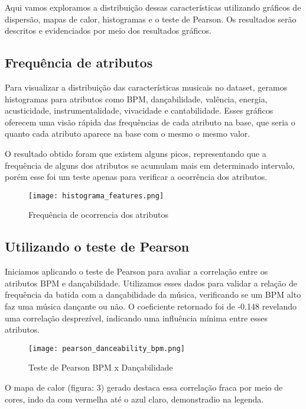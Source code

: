 \documentclass[12pt]{article}
\begin{document}
Aqui vamos exploramos a distribuição dessas características utilizando gráficos de dispersão, mapas de calor, histogramas e o teste de Pearson\cite{kaggle-spotify-analysis}. Os resultados serão descritos e evidenciados por meio dos resultados gráficos.

\subsection{Frequência de atributos}

Para visualizar a distribuição das características musicais no dataset, geramos histogramas para atributos como BPM, dançabilidade, valência, energia, acusticidade, instrumentalidade, vivacidade e cantabilidade. Esses gráficos oferecem uma visão rápida das frequências de cada atributo na base, que seria o quanto cada atributo aparece na base com o mesmo o mesmo valor.

O resultado obtido foram que existem alguns picos, representando que a frequência de alguns dos atributos se acumulam mais em determinado intervalo, porém esse foi um teste apenas para verificar a ocorrência dos atributos.

\begin{figure}[ht]
\centering
\texttt{[image: histograma\_features.png]}
\caption{Frequência de ocorrencia dos atributos}
\label{fig:exampleFig1}
\end{figure}

\subsection{Utilizando o teste de Pearson}

Iniciamos aplicando o teste de Pearson para avaliar a correlação entre os atributos BPM e dançabilidade. Utilizamos esses dados para validar a relação de frequência da batida com a dançabilidade da música, verificando se um BPM alto faz uma música dançante ou não. O coeficiente retornado foi de -0.148 revelando uma correlação desprezível, indicando uma influência mínima entre esses atributos. 

\begin{figure}[ht]
\centering
\texttt{[image: pearson\_danceability\_bpm.png]}
\caption{Teste de Pearson BPM x Dançabilidade}
\label{fig:exampleFig2}
\end{figure}

O mapa de calor (figura: 3) gerado destaca essa correlação fraca por meio de cores, indo da com vermelha até o azul claro, demonstradio na legenda. 
\end{document}

